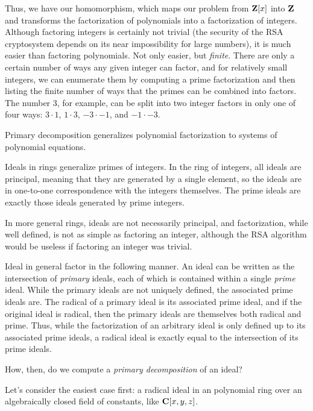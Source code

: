 Thus, we have our homomorphism, which maps our problem from ${\bf
Z}[x]$ into ${\bf Z}$ and transforms the factorization of polynomials
into a factorization of integers.  Although factoring integers is
certainly not trivial (the security of the RSA cryptosystem depends on
its near impossibility for large numbers), it is much easier than
factoring polynomials.  Not only easier, but {\it finite}.  There are
only a certain number of ways any given integer can factor, and for
relatively small integers, we can enumerate them by computing a prime
factorization and then listing the finite number of ways that the
primes can be combined into factors.  The number $3$, for example, can
be split into two integer factors in only one of four ways: $3\cdot1$,
$1\cdot3$, $-3\cdot-1$, and $-1\cdot-3$.


Primary decomposition generalizes polynomial factorization
to systems of polynomial equations.

Ideals in rings generalize primes of integers.  In the ring
of integers, all ideals are principal, meaning that they are
generated by a single element, so the ideals are in one-to-one
correspondence with the integers themselves.  The
prime ideals are exactly those ideals generated by prime integers.

In more general rings, ideals are not necessarily principal,
and factorization, while well defined, is not as simple
as factoring an integer, although the RSA algorithm
would be useless if factoring an integer was trivial.

Ideal in general factor in the following manner.
An ideal can be written as the intersection of
{\it primary} ideals, each of which is contained
within a single {\it prime} ideal.  While the primary
ideals are not uniquely defined, the associated
prime ideals are.  The radical of a primary ideal
is its associated prime ideal, and if the original ideal is radical,
then the primary ideals are themselves both radical and prime.
Thus, while the factorization of an arbitrary ideal is only
defined up to its associated prime ideals, a radical ideal
is exactly equal to the intersection of its prime ideals.

How, then, do we compute a {\it primary decomposition} of an ideal?

Let's consider the easiest case first: a radical ideal in an polynomial
ring over an algebraically closed field of constants, like ${\bf C}[x,y,z]$.

